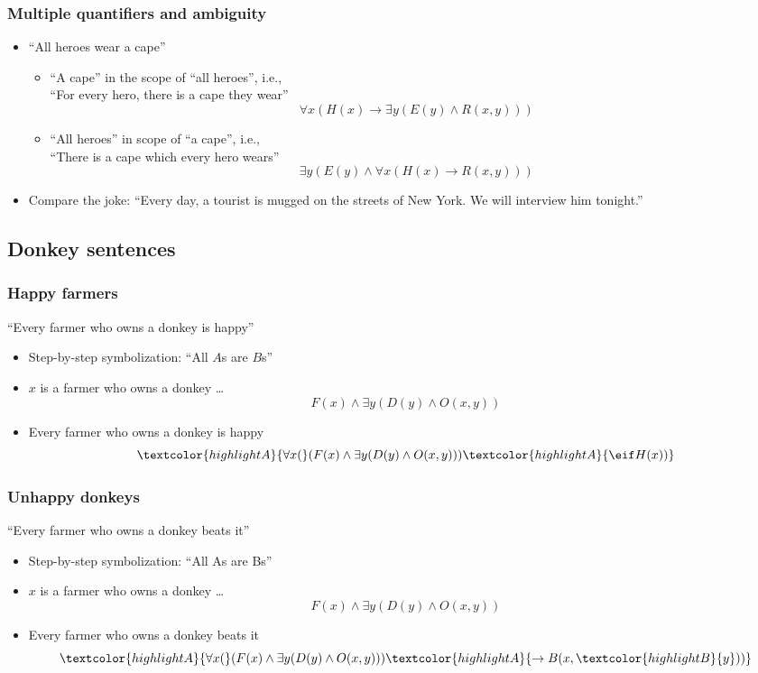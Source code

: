\begin{frame}
    \frametitle{Multiple quantifiers and ambiguity}

\begin{itemize}[<+->]
\item ``All heroes wear a cape''
\begin{itemize}[<+->]
\item ``A cape'' in the scope of ``all heroes'', i.e.,\\
``For every hero, there is a cape they wear''\pauses
\[
\forall x(H(x) \to \exists y(E(y) \land R(x, y)))
\]
\item ``All heroes'' in scope of ``a cape'', i.e.,\\
``There is a cape which every hero wears''\pauses
\[
\exists y(E(y) \land \forall x(H(x) \to R(x, y)))
\]
\end{itemize}
\item Compare the joke: ``Every day, a tourist is mugged on the streets of New York. We will interview him tonight.''
\end{itemize}
\end{frame}


\subsection{Donkey sentences}

\begin{frame}
    \frametitle{Happy farmers}

``Every farmer who owns a donkey is happy''

\begin{itemize}[<+->]
\item Step-by-step symbolization: ``All $A$s are $B$s''
\item $x$ is a farmer who owns a donkey \dots\[
F(x) \land \exists y(D(y) \land O(x, y))
\]
\item \textcolor{highlightA}{Every} farmer who owns a donkey \textcolor{highlightA}{is happy}
\[
\textcolor{highlightA}{\forall x(}(F(x) \land \exists y(D(y) \land O(x, y))) \textcolor{highlightA}{\eif H(x))}
\]
\end{itemize}
\end{frame}

\begin{frame}
    \frametitle{Unhappy donkeys}

``Every farmer who owns a donkey beats it''

\begin{itemize}[<+->]
\item Step-by-step symbolization: ``All As are Bs''
\item $x$ is a farmer who owns a donkey \dots\[
F(x) \land \exists y(D(y) \land O(x, y))
\]
\item \textcolor{highlightA}{Every} farmer who owns a donkey \textcolor{highlightA}{beats it}
\[
\textcolor{highlightA}{\forall x(}(F(x) \land \exists y(D(y) \land O(x, y))) \textcolor{highlightA}{\to B(x, \textcolor{highlightB}{y}))}
\]
\end{itemize}
\end{frame}

